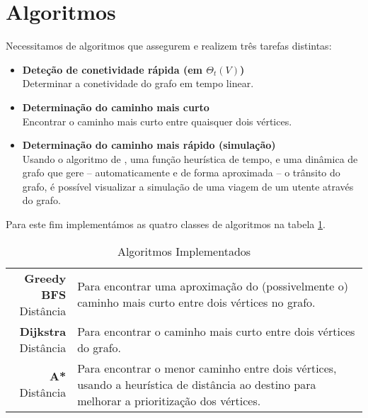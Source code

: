 \documentclass[relatorio.tex]{subfiles}
\begin{document}
\section{Algoritmos}
\label{sec:alg}

Necessitamos de algoritmos que assegurem e realizem três tarefas distintas:

\begin{itemize}
\item \textbf{Deteção de conetividade rápida (em $\Theta_t(V)$)}\\
Determinar a conetividade do grafo em tempo linear.

\item \textbf{Determinação do caminho mais curto}\\
Encontrar o caminho mais curto entre quaisquer dois vértices.

\item \textbf{Determinação do caminho mais rápido (simulação)}\\
Usando o algoritmo de , uma função heurística
de tempo, e uma dinâmica de grafo que gere -- automaticamente e
de forma aproximada -- o trânsito do grafo, é possível visualizar
a simulação de uma viagem de um utente através do grafo.
\end{itemize}

Para este fim implementámos as quatro classes de algoritmos na tabela \ref{tab:algorithms}.

\begin{table}[hbpt]
\caption{Algoritmos Implementados}
\label{tab:algorithms}
\begin{tabularx}{\textwidth}{rX}
\makecell[cr]{\textbf{Greedy BFS}\\Distância}&
Para encontrar uma aproximação do
(possivelmente o) caminho mais curto
entre dois vértices no grafo.\\

\makecell[cr]{\textbf{Dijkstra}\\Distância}&
Para encontrar o caminho mais curto
entre dois vértices do grafo.\\

\makecell[cr]{\textbf{A*}\\Distância}&
Para encontrar o menor caminho
entre dois vértices, usando a heurística
de distância ao destino
para melhorar a prioritização dos vértices.\\
\end{tabularx}
\end{table}
\end{document}

